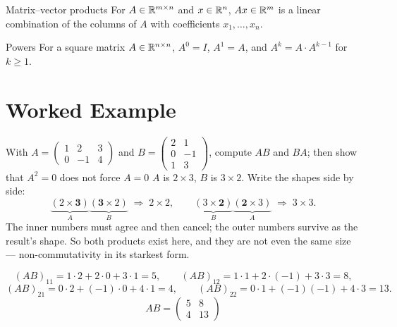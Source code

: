 \begin{rulebox}{Matrix--vector products}
For $A \in \mathbb{R}^{m \times n}$ and $x \in \mathbb{R}^{n}$, $A x \in \mathbb{R}^{m}$ is a linear
combination of the columns of $A$ with coefficients $x_{1}, \dots, x_{n}$.
\end{rulebox}

\begin{rulebox}{Powers}
For a square matrix $A \in \mathbb{R}^{n \times n}$, $A^{0} = I$, $A^{1} = A$, and
$A^{k} = A \cdot A^{k - 1}$ for $k \ge 1$.
\end{rulebox}

\section{Worked Example}

\begin{worked}{With $A=\begin{pmatrix}1&2&3\\0&-1&4\end{pmatrix}$ and $B=\begin{pmatrix}2&1\\0&-1\\1&3\end{pmatrix}$, compute $AB$ and $BA$; then show that $A^{2}=0$ does not force $A=0$}
$A$ is $2\times3$, $B$ is $3\times2$. Write the shapes side by side:
\[
  \underbrace{(2\times\mathbf 3)}_{A}\underbrace{(\mathbf 3\times2)}_{B}
  \;\Longrightarrow\;2\times2,
  \qquad
  \underbrace{(3\times\mathbf 2)}_{B}\underbrace{(\mathbf 2\times3)}_{A}
  \;\Longrightarrow\;3\times3 .
\]
The inner numbers must agree and then cancel; the outer numbers survive as
the result's shape. So both products exist here, and they are not even the
same size --- non-commutativity in its starkest form.

\[
  (AB)_{11}=1\cdot2+2\cdot0+3\cdot1=5,\qquad
  (AB)_{12}=1\cdot1+2\cdot(-1)+3\cdot3=8,
\]
\[
  (AB)_{21}=0\cdot2+(-1)\cdot0+4\cdot1=4,\qquad
  (AB)_{22}=0\cdot1+(-1)(-1)+4\cdot3=13 .
\]
\[
  AB=\begin{pmatrix}5&8\\4&13\end{pmatrix}
\]


\end{worked}
